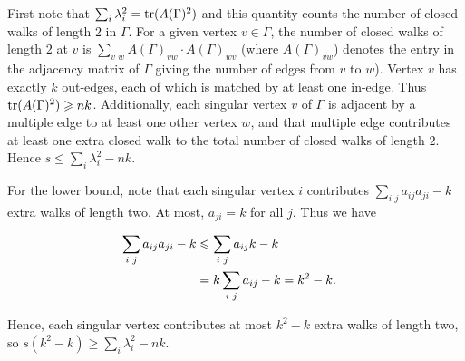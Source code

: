 First note that $\sum_{i} \lambda_i^2 = \tr(A(\Gamma)^2)$ and this quantity counts the number of closed walks of length $2$ in $\Gamma$. For a given vertex $v \in \Gamma$, the number of closed walks of length $2$ at $v$ is $\sum_{v \text{~} w} A(\Gamma)_{vw} \cdot A(\Gamma)_{wv}$ (where $A(\Gamma)_{vw}$) denotes the entry in the adjacency matrix of $\Gamma$ giving the number of edges from $v$ to $w$). Vertex $v$ has exactly $k$ out-edges, each of which is matched by at least one in-edge. Thus $\tr(A(\Gamma)^2) \ge n k$. Additionally, each singular vertex $v$ of $\Gamma$ is adjacent by a multiple edge to at least one other vertex $w$, and that multiple edge contributes at least one extra closed walk to the total number of closed walks of length $2$. Hence $s \le \sum_{i} \lambda_i^2 - n k$. 

For the lower bound, note that each singular vertex $i$ contributes $ \sum_{i \text{~} j} a_{ij} a_{ji} - k $ extra walks of length  two. At most, $a_{ji} = k$ for all $j$. Thus we have

\begin{align*}
    \sum_{i \text{~} j} a_{ij} a_{ji} - k & \le \sum_{i \text{~} j} a_{ij} k - k \cr
                                          & = k \sum_{i \text{~} j} a_{ij} - k = k^2 - k.
\end{align*}

Hence, each singular vertex contributes at most $k^2 - k$ extra walks of length two, so $s(k^2 - k) \ge \sum_{i} \lambda_i^2 - n k$.